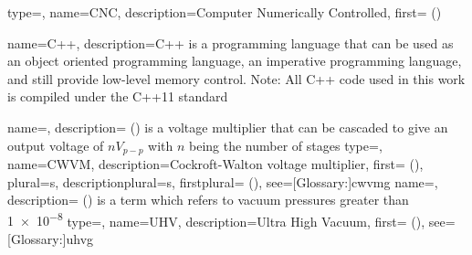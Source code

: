 {
    type=\acronymtype,
    name={CNC},
    description={Computer Numerically Controlled},
    first={ ()}
}

{%
    name={C++},
    description={C++ is a programming language that can be used as an object oriented programming language, an imperative programming language, and still provide low-level memory control. Note: All C++ code used in this work is compiled under the C++11 standard}
}

{
    name={},
    description={ () is a voltage multiplier that can be cascaded to give an output voltage of \(nV_{p-p}\) with \(n\) being the number of stages}
}
{
    type=\acronymtype,
    name={CWVM},
    description={Cockroft-Walton voltage multiplier},
    first={ ()},
    plural={s},
    descriptionplural={s},
    firstplural={ ()},
    see=[Glossary:]{cwvmg}
}
{%
    name={},
    description={ ()  is a term which refers to vacuum pressures greater than \SI{1e-8}{\torr}\cite{Bello_2017}}
}
{%
    type=\acronymtype,
    name={UHV},
    description={Ultra High Vacuum},
    first={ ()},
    see=[Glossary:]{uhvg}
}
